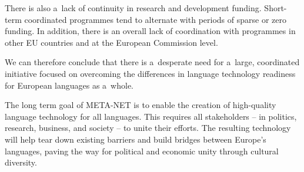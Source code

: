 \begin{multicols}{2}
There is also a~lack of continuity in research and development
funding. Short-term coordinated programmes tend to alternate with
periods of sparse or zero funding. In addition, there is an overall
lack of coordination with programmes in other EU countries and at the
European Commission level. 

We can therefore conclude that there is a~desperate need for a~large,
coordinated initiative focused on overcoming the differences in
language technology readiness for European languages as a~whole. 

The long term goal of META-NET is to enable the creation of high-quality language technology for all languages. This requires all stakeholders -- in politics, research, business, and society -- to unite their efforts. The resulting technology will help tear down existing barriers and build bridges between Europe’s languages, paving the way for political and economic unity through cultural diversity. 
\end{multicols}
\clearpage
